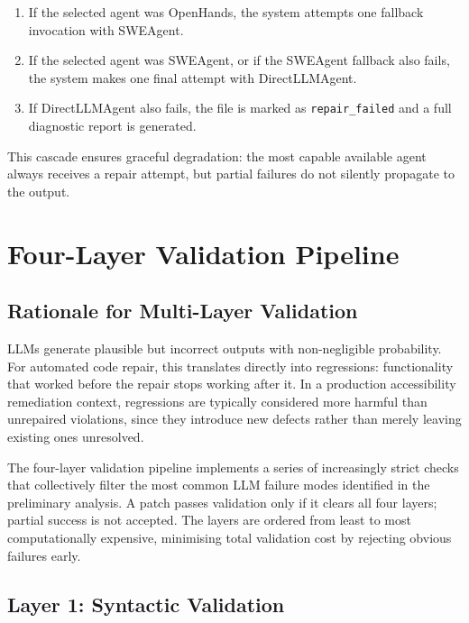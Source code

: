\begin{enumerate}
  \item If the selected agent was OpenHands, the system attempts one fallback
    invocation with SWEAgent.
  \item If the selected agent was SWEAgent, or if the SWEAgent fallback also
    fails, the system makes one final attempt with DirectLLMAgent.
  \item If DirectLLMAgent also fails, the file is marked as \texttt{repair\_failed}
    and a full diagnostic report is generated.
\end{enumerate}

This cascade ensures graceful degradation: the most capable available agent
always receives a repair attempt, but partial failures do not silently
propagate to the output.

\section{Four-Layer Validation Pipeline}
\label{sec:validation_pipeline}

\subsection{Rationale for Multi-Layer Validation}

LLMs generate plausible but incorrect outputs with non-negligible probability.
For automated code repair, this translates directly into regressions:
functionality that worked before the repair stops working after it.  In a
production accessibility remediation context, regressions are typically
considered more harmful than unrepaired violations, since they introduce new
defects rather than merely leaving existing ones unresolved.

The four-layer validation pipeline implements a series of increasingly strict
checks that collectively filter the most common LLM failure modes identified
in the preliminary analysis.  A patch passes validation only if it clears all
four layers; partial success is not accepted.  The layers are ordered from
least to most computationally expensive, minimising total validation cost by
rejecting obvious failures early.

\subsection{Layer 1: Syntactic Validation}


